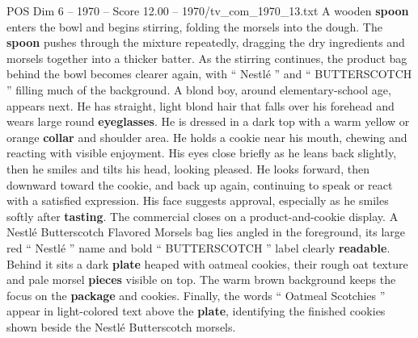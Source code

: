 \begin{textsample}{POS Dim 6 – 1970 – Score 12.00 – 1970/tv\_com\_1970\_13.txt}
A wooden \textbf{spoon} enters the bowl and begins stirring, folding the morsels into the dough.
The \textbf{spoon} pushes through the mixture repeatedly, dragging the dry ingredients and morsels together into a thicker batter.
As the stirring continues, the product bag behind the bowl becomes clearer again, with “ Nestlé ” and “ BUTTERSCOTCH ” filling much of the background.
A blond boy, around elementary-school age, appears next.
He has straight, light blond hair that falls over his forehead and wears large round \textbf{eyeglasses}.
He is dressed in a dark top with a warm yellow or orange \textbf{collar} and shoulder area.
He holds a cookie near his mouth, chewing and reacting with visible enjoyment.
His eyes close briefly as he leans back slightly, then he smiles and tilts his head, looking pleased.
He looks forward, then downward toward the cookie, and back up again, continuing to speak or react with a satisfied expression.
His face suggests approval, especially as he smiles softly after \textbf{tasting}.
The commercial closes on a product-and-cookie display.
A Nestlé Butterscotch Flavored Morsels bag lies angled in the foreground, its large red “ Nestlé ” name and bold “ BUTTERSCOTCH ” label clearly \textbf{readable}.
Behind it sits a dark \textbf{plate} heaped with oatmeal cookies, their rough oat texture and pale morsel \textbf{pieces} visible on top.
The warm brown background keeps the focus on the \textbf{package} and cookies.
Finally, the words “ Oatmeal Scotchies ” appear in light-colored text above the \textbf{plate}, identifying the finished cookies shown beside the Nestlé Butterscotch morsels.

\end{textsample}
